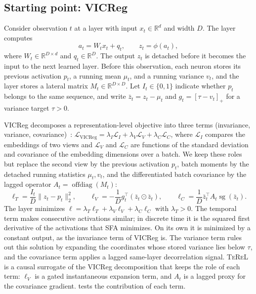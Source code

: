 \documentclass[11pt]{article}
\newcommand{\TeReL}{\textsc{TeReL}}
\newcommand{\stopgrad}{\operatorname{sg}}
\newcommand{\offdiag}{\operatorname{offdiag}}
\begin{document}
\subsection{Starting point: VICReg}

Consider observation $t$ at a layer with input $x_t\in\mathbb R^d$ and width
$D$. The layer computes
\begin{equation}
  a_t=W_tx_t+q_t,
  \qquad z_t=\phi(a_t),
  \label{eq:forward}
\end{equation}
where $W_t\in\mathbb R^{D\times d}$ and $q_t\in\mathbb R^D$. The output $z_t$
is detached before it becomes the input to the next learned layer. Before this
observation, each neuron stores its previous activation $p_t$, a running mean
$\mu_t$, and a running variance $v_t$, and the layer stores a lateral matrix
$M_t\in\mathbb R^{D\times D}$. Let $I_t\in\{0,1\}$ indicate whether $p_t$
belongs to the same sequence, and write $\bar z_t=z_t-\mu_t$ and
$g_t=[\tau-v_t]_+$ for a variance target $\tau>0$.

VICReg decomposes a representation-level objective into three terms
(invariance, variance, covariance)~\cite{bardes2022}:
$\mathcal L_{\mathrm{VICReg}}=\lambda_I\mathcal L_I+
\lambda_V\mathcal L_V+\lambda_C\mathcal L_C$, where $\mathcal L_I$ compares
the embeddings of two views and $\mathcal L_V$ and $\mathcal L_C$ are
functions of the standard deviation and covariance of the embedding
dimensions over a batch. We keep these roles but replace
the second view by the previous activation $p_t$, batch moments by the
detached running statistics $\mu_t,v_t$, and the differentiated batch
covariance by the lagged operator $A_t=\offdiag(M_t)$:
\begin{equation}
\ell_T=\frac{I_t}{D}\lVert z_t-p_t\rVert_2^2,
\qquad
\ell_V=-\frac1D g_t^\top(\bar z_t\odot\bar z_t),
\qquad
\ell_C=\frac1D\bar z_t^\top A_t\stopgrad(\bar z_t).
\label{eq:local-losses}
\end{equation}
The layer minimizes $\ell=\lambda_T\ell_T+\lambda_V\ell_V+\lambda_C\ell_C$
with $\lambda_T>0$. The temporal term makes consecutive activations
similar; in discrete time it is the squared first derivative of the
activations that SFA minimizes. On its own it is minimized by a constant
output, as the invariance term of VICReg is. The variance term rules out this
solution by expanding the coordinates whose stored variance lies below $\tau$,
and the covariance term applies a lagged same-layer decorrelation signal.
\TeReL{} is a causal surrogate of the VICReg decomposition that keeps the
role of each term: $\ell_V$ is a gated instantaneous expansion term, and $A_t$
is a lagged proxy for the covariance gradient.  tests the
contribution of each term.
\end{document}
